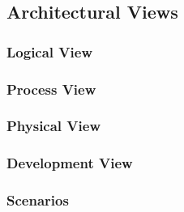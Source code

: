 \subsection{Architectural Views}

\subsubsection{Logical View} %

\subsubsection{Process View} %

\subsubsection{Physical View} %

\subsubsection{Development View} %

\subsubsection{Scenarios} %
